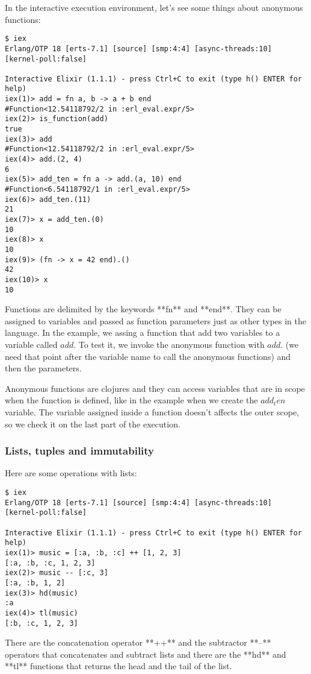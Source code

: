 In the interactive execution environment, let's see some things about anonymous
functions:

\begin{verbatim}
$ iex
Erlang/OTP 18 [erts-7.1] [source] [smp:4:4] [async-threads:10] [kernel-poll:false]

Interactive Elixir (1.1.1) - press Ctrl+C to exit (type h() ENTER for help)
iex(1)> add = fn a, b -> a + b end
#Function<12.54118792/2 in :erl_eval.expr/5>
iex(2)> is_function(add)
true
iex(3)> add
#Function<12.54118792/2 in :erl_eval.expr/5>
iex(4)> add.(2, 4)
6
iex(5)> add_ten = fn a -> add.(a, 10) end
#Function<6.54118792/1 in :erl_eval.expr/5>
iex(6)> add_ten.(11)
21
iex(7)> x = add_ten.(0)
10
iex(8)> x
10
iex(9)> (fn -> x = 42 end).()
42
iex(10)> x
10
\end{verbatim}

Functions are delimited by the keywords **fn** and **end**. They can be assigned
to variables and passed as function parameters just as other types in the
language. In the example, we assing a function that add two variables to a
variable called $add$. To test it, we invoke the anonymous function with $add.$
(we need that point after the variable name to call the anonymous functions) and
then the parameters.

Anonymous functions are clojures and they can access variables that are in scope
when the function is defined, like in the example when we create the $add_ten$
variable. The variable assigned inside a function doesn't affects the outer
scope, so we check it on the last part of the execution.

\subsubsection{Lists, tuples and immutability}

Here are some operations with lists:

\begin{verbatim}
$ iex
Erlang/OTP 18 [erts-7.1] [source] [smp:4:4] [async-threads:10] [kernel-poll:false]

Interactive Elixir (1.1.1) - press Ctrl+C to exit (type h() ENTER for help)
iex(1)> music = [:a, :b, :c] ++ [1, 2, 3]
[:a, :b, :c, 1, 2, 3]
iex(2)> music -- [:c, 3]
[:a, :b, 1, 2]
iex(3)> hd(music)
:a
iex(4)> tl(music)
[:b, :c, 1, 2, 3]
\end{verbatim}

There are the concatenation operator **++** and the subtractor **--** operators
that concatenates and subtract lists and there are the **hd** and **tl**
functions that returns the head and the tail of the list.

